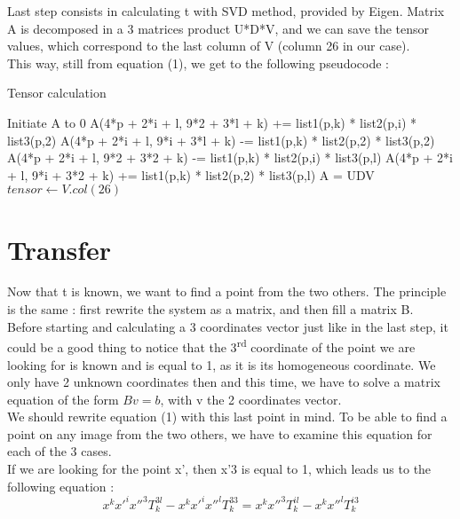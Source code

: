 \documentclass[a4paper,10pt]{report}
\begin{document}
Last step consists in calculating t with SVD method, provided by Eigen. Matrix A is decomposed in a 3 matrices product U*D*V, and we can save the tensor values, which correspond to the last column of V (column 26 in our case).
\\

This way, still from equation (1), we get to the following pseudocode :
\begin{algorithm}
\caption{Tensor calculation}
\begin{algorithmic}
\STATE Initiate A to 0
\STATE A(4*p + 2*i + l, 9*2 + 3*l + k) += list1(p,k) * list2(p,i) * list3(p,2)
\STATE A(4*p + 2*i + l, 9*i + 3*l + k) -= list1(p,k) * list2(p,2) * list3(p,2)
\STATE A(4*p + 2*i + l, 9*2 + 3*2 + k) -= list1(p,k) * list2(p,i) * list3(p,l)
\STATE A(4*p + 2*i + l, 9*i + 3*2 + k) += list1(p,k) * list2(p,2) * list3(p,l)
\ENDFOR
\ENDFOR
\ENDFOR
\ENDFOR
\STATE A = UDV 
\STATE $tensor \leftarrow V.col(26)$
\end{algorithmic}
\end{algorithm}

\section{Transfer}


Now that t is known, we want to find a point from the two others. The principle is the same : first rewrite the system as a matrix, and then fill a matrix B.
\\

Before starting and calculating a 3 coordinates vector just like in the last step, it could be a good thing to notice that the 3\textsuperscript{rd} 
coordinate of the point we are looking for is known and is equal to 1, as it is its homogeneous coordinate. We only have 2 unknown coordinates then 
and this time, we have to solve a matrix equation of the form \begin{math}Bv = b\end{math},  with v the 2 coordinates vector.
\\

We should rewrite equation (1) with this last point in mind. To be able to find a point on any image from the two others, we have to 
examine this equation for each of the 3 cases.
\\

If we are looking for the point x’, then x’3 is equal to 1, which leads us to the following equation :
\[x^{k}x'^{i}x''^{3}T^{3l}_{k} - x^{k}x'^{i}x''^{l}T^{33}_{k} = x^{k}x''^{3}T^{il}_{k} - x^{k}x''^{l}T^{i3}_{k}\]
\end{document}
